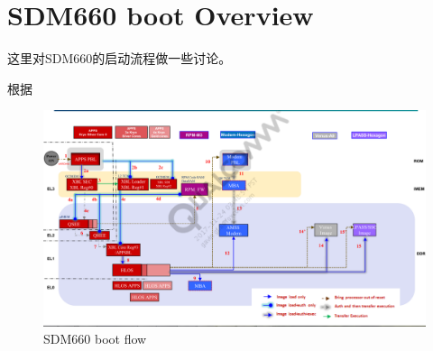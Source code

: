 \section {SDM660 boot Overview}


这里对SDM660的启动流程做一些讨论。




根据

\begin{figure}[htbp]
\begin{center}
\includegraphics[width=16cm]{img/bootarch}
\caption{SDM660 boot flow}
\label{sdm660boot}
\end{center}
\vspace{-0.5em}
\end{figure}





